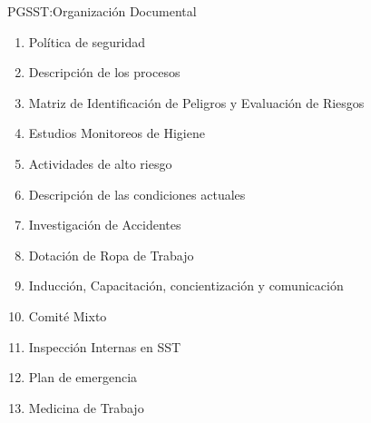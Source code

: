\documentclass[spanish]{beamer} %
\begin{document}
\begin{frame}{PGSST:Organización Documental}
  \scriptsize
  \begin{enumerate}
    \item Política de seguridad
    \item Descripción de los procesos
    \item Matriz de Identificación de Peligros y Evaluación de Riesgos
    \item Estudios Monitoreos de Higiene
    \item Actividades de alto riesgo
    \item Descripción de las condiciones actuales
    \item Investigación de Accidentes
    \item Dotación de Ropa de Trabajo
    \item Inducción, Capacitación, concientización y comunicación
    \item Comité Mixto
    \item Inspección Internas en SST
    \item Plan de emergencia
    \item Medicina de Trabajo
\end{enumerate}
\end{frame}
\end{document}
